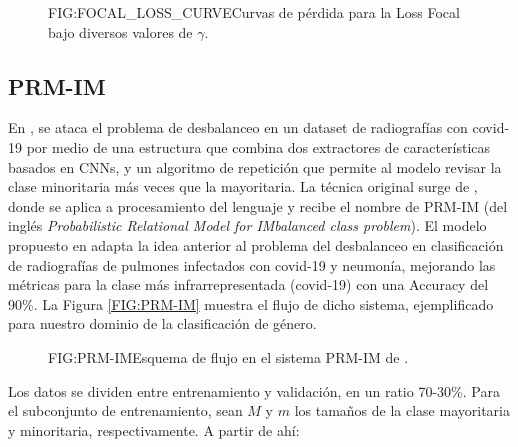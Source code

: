 \begin{figure}[Curva de la Loss Focal]{FIG:FOCAL_LOSS_CURVE}{Curvas de pérdida para la Loss Focal bajo diversos valores de $\gamma$.}
\end{figure}

\subsection{PRM-IM\label{SUBSEC:PRMIM}}

En \citet{rahimzadeh2020modified}, se ataca el problema de desbalanceo en un dataset de radiografías con covid-19 por medio de una estructura que combina dos extractores de características basados en CNNs, y un algoritmo de repetición que permite al modelo revisar la clase minoritaria más veces que la mayoritaria. La técnica original surge de \citet{ghanem2008learning}, donde se aplica a procesamiento del lenguaje y recibe el nombre de PRM-IM (del inglés \textit{Probabilistic Relational Model for IMbalanced class problem}). El modelo propuesto en \citet{rahimzadeh2020modified} adapta la idea anterior al problema del desbalanceo en clasificación de radiografías de pulmones infectados con covid-19 y neumonía, mejorando las métricas para la clase más infrarrepresentada (covid-19) con una Accuracy del 90\%. La Figura \ref{FIG:PRM-IM} muestra el flujo de dicho sistema, ejemplificado para nuestro dominio de la clasificación de género.

\begin{figure}[Esquema de un PRM-IM]{FIG:PRM-IM}{Esquema de flujo en el sistema PRM-IM de \cite{rahimzadeh2020modified}.}
\end{figure}

Los datos se dividen entre entrenamiento y validación, en un ratio 70-30\%. Para el subconjunto de entrenamiento, sean $M$ y $m$ los tamaños de la clase mayoritaria y minoritaria, respectivamente. A partir de ahí:

